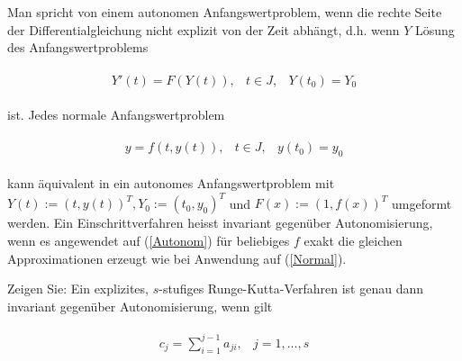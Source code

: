 \begin{exercise}

Man spricht von einem autonomen Anfangswertproblem, wenn die rechte Seite der Differentialgleichung
nicht explizit von der Zeit abhängt, d.h. wenn $Y$ Lösung des Anfangswertproblems

\begin{align}
\label{Autonom} \tag{2}
  \begin{array}{lll}
    Y'(t)=F(Y(t)), &t\in J, &Y(t_0)=Y_0
  \end{array}
\end{align}

ist. Jedes normale Anfangswertproblem

\begin{align}
  \label{Normal} \tag{3}
  \begin{array}{lll}
    y=f(t,y(t)), &t\in J, &y(t_0)=y_0
  \end{array}
\end{align}

kann äquivalent in ein autonomes Anfangswertproblem mit
$Y(t):=(t,y(t))^T, Y_0:=(t_0,y_0)^T$ und $F(x):=(1,f(x))^T$
umgeformt werden. Ein Einschrittverfahren heisst invariant gegenüber Autonomisierung,
wenn es angewendet auf (\ref{Autonom}) für beliebiges $f$ exakt die gleichen Approximationen
erzeugt wie bei Anwendung auf (\ref{Normal}). \newline

Zeigen Sie: Ein explizites, $s$-stufiges Runge-Kutta-Verfahren ist genau dann invariant
gegenüber Autonomisierung, wenn gilt

\begin{align} \label{Bedingung} \tag{4}
  \begin{array}{ll}
    c_j = \sum_{i=1}^{j-1} a_{ji}, &j=1,...,s
  \end{array}
\end{align}
\end{exercise}

